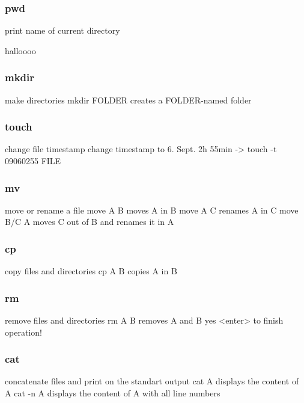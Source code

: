 \documentclass[10pt,a4paper]{scrartcl}
\begin{document}
\begin{description}
\subsubsection{pwd}
\begin{terminalcode}
print name of current directory
\end{terminalcode}
halloooo
\subsubsection{mkdir}
\begin{terminalcode}
make directories
mkdir FOLDER creates a FOLDER-named folder
\end{terminalcode}

\subsubsection{touch}
\begin{terminalcode}
change file timestamp
change timestamp to 6. Sept. 2h 55min -> touch -t 09060255 FILE
\end{terminalcode}

\subsubsection{mv}
\begin{terminalcode}
move or rename a file
move A B moves A in B
move A C renames A in C
move B/C A moves C out of B and renames it in A
\end{terminalcode}

\subsubsection{cp}
\begin{terminalcode}
copy files and directories
cp A B copies A in B
\end{terminalcode}

\subsubsection{rm}
\begin{terminalcode}
remove files and directories
rm A B removes A and B
yes <enter> to finish operation!
\end{terminalcode}

\subsubsection{cat}
\begin{terminalcode}
concatenate files and print on the standart output
cat A displays the content of A
cat -n A displays the content of A with all line numbers
\end{terminalcode}


\end{description}
\end{document}
